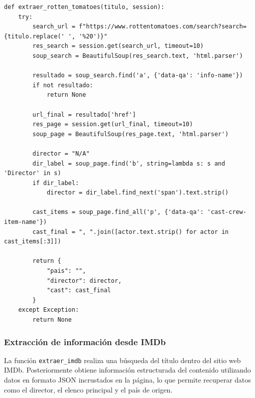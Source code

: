 \documentclass[12pt]{article}
\begin{document}
\begin{lstlisting}
def extraer_rotten_tomatoes(titulo, session):
    try:
        search_url = f"https://www.rottentomatoes.com/search?search={titulo.replace(' ', '%20')}"
        res_search = session.get(search_url, timeout=10)
        soup_search = BeautifulSoup(res_search.text, 'html.parser')
        
        resultado = soup_search.find('a', {'data-qa': 'info-name'})
        if not resultado:
            return None
            
        url_final = resultado['href']
        res_page = session.get(url_final, timeout=10)
        soup_page = BeautifulSoup(res_page.text, 'html.parser')
        
        director = "N/A"
        dir_label = soup_page.find('b', string=lambda s: s and 'Director' in s)
        if dir_label:
            director = dir_label.find_next('span').text.strip()
            
        cast_items = soup_page.find_all('p', {'data-qa': 'cast-crew-item-name'})
        cast_final = ", ".join([actor.text.strip() for actor in cast_items[:3]])

        return {
            "pais": "",
            "director": director,
            "cast": cast_final
        }
    except Exception:
        return None
\end{lstlisting}

\subsubsection{Extracción de información desde IMDb}

La función \texttt{extraer\_imdb} realiza una búsqueda del título dentro del sitio web IMDb.
Posteriormente obtiene información estructurada del contenido utilizando datos en formato
JSON incrustados en la página, lo que permite recuperar datos como el director, el elenco
principal y el país de origen.
\end{document}
